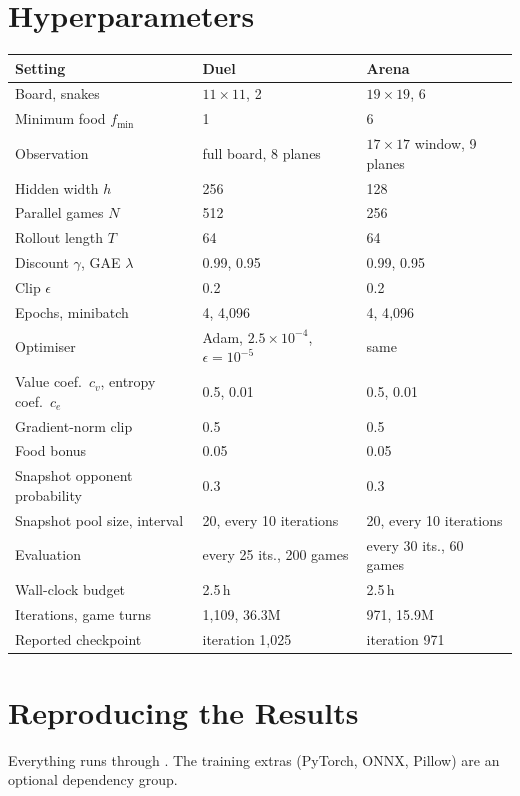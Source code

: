 \chapter{Hyperparameters}\label{app:hparams}

\begin{center}
\begin{tabular}{@{}lll@{}}
\toprule
\textbf{Setting} & \textbf{Duel} & \textbf{Arena}\\
\midrule
Board, snakes & $11\times11$, 2 & $19\times19$, 6\\
Minimum food $f_{\min}$ & 1 & 6\\
Observation & full board, 8 planes & $17\times17$ window, 9 planes\\
Hidden width $h$ & 256 & 128\\
Parallel games $N$ & 512 & 256\\
Rollout length $T$ & 64 & 64\\
Discount $\gamma$, GAE $\lambda$ & 0.99, 0.95 & 0.99, 0.95\\
Clip $\epsilon$ & 0.2 & 0.2\\
Epochs, minibatch & 4, 4{,}096 & 4, 4{,}096\\
Optimiser & Adam, $2.5\times10^{-4}$, $\epsilon{=}10^{-5}$ & same\\
Value coef.\ $c_v$, entropy coef.\ $c_e$ & 0.5, 0.01 & 0.5, 0.01\\
Gradient-norm clip & 0.5 & 0.5\\
Food bonus & 0.05 & 0.05\\
Snapshot opponent probability & 0.3 & 0.3\\
Snapshot pool size, interval & 20, every 10 iterations & 20, every 10 iterations\\
Evaluation & every 25 its., 200 games & every 30 its., 60 games\\
Wall-clock budget & 2.5\,h & 2.5\,h\\
Iterations, game turns & 1{,}109, 36.3M & 971, 15.9M\\
Reported checkpoint & iteration 1{,}025 & iteration 971\\
\bottomrule
\end{tabular}
\end{center}

\chapter{Reproducing the Results}\label{app:repro}

Everything runs through . The training extras (PyTorch, ONNX, Pillow) are an
optional dependency group.

